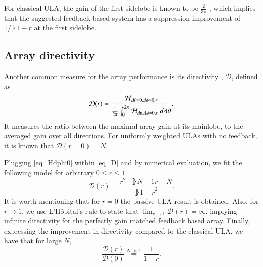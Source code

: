 \ifdefined\showDev
\else
\fi
For classical ULA, the gain of the first sidelobe is known to be $\frac{2}{3\pi}$ \cite{VanTrees2002DetectionIV}, which implies that the suggested feedback based system has a suppression improvement of $1/\rBrace{1-r}$ at the first sidelobe.

\subsection*{Array directivity}
Another common measure for the array performance is its directivity \cite{VanTrees2002DetectionIV}, $\mathcal{D}$, defined as
\begin{equation}\label{eq_D}
    \mathcal{D}(r) = \frac{\Hr_{\dTheta=0,\dPhi=0,r}}{\frac{1}{2\pi}\int_{0}^{2\pi}\Hr_{\dTheta,\dPhi=0,r}\ d\dTheta}.
\end{equation}
It measures the ratio between the maximal array gain at its mainlobe, to the averaged gain over all directions. For uniformly weighted ULAs with no feedback, it is known \cite{VanTrees2002DetectionIV} that $\mathcal{D}(r=0) = N$.
\par Plugging \eqref{eq_Hdphi0} within \eqref{eq_D} and by numerical evaluation, we fit the following model for arbitrary $0\leq r\leq 1$
\begin{equation}\label{eq_D}
    \mathcal{D}(r) = \frac{r^{2}-\rBrace{N-1}r+N}{\rBrace{1-r}^{2}}.
\end{equation}
It is worth mentioning that for $r=0$ the passive ULA result is obtained. Also, for $r\to1$, we use L'Hôpital's rule to state that $\lim_{r\rightarrow 1}\mathcal{D}(r)=\infty$, implying infinite directivity for the perfectly gain matched feedback based array. Finally, expressing the improvement in directivity compared to the classical ULA, we have that for large $N$,
\begin{equation}\label{eq_Dimprovement}
\frac{\mathcal{D}(r)}{\mathcal{D}(0)}\overset{N\gg1}{=}\frac{1}{1-r}.
\end{equation}
